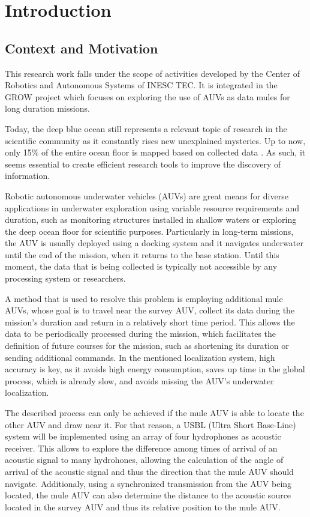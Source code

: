 \chapter{Introduction} \label{chap:intro}


\section{Context and Motivation} \label{sec:context}

This research work falls under the scope of activities developed by the Center of Robotics and Autonomous Systems of INESC TEC. It is integrated in the GROW project which focuses on exploring the use of AUVs as data mules for long duration missions.

Today, the deep blue ocean still represents a relevant topic of research in the scientific community as it constantly rises new unexplained mysteries. Up to now, only 15\% of the entire ocean floor is mapped based on collected data \cite{deeperblue}. As such, it seems essential to create efficient research tools to improve the discovery of information.


Robotic autonomous underwater vehicles (AUVs) are great means for diverse applications in underwater exploration using variable resource requirements and duration, such as monitoring structures installed in shallow waters or exploring the deep ocean floor for scientific purposes. Particularly in long-term missions, the AUV is usually deployed using a docking system and it navigates underwater until the end of the mission, when it returns to the base station. Until this moment, the data that is being collected is typically not accessible by any processing system or researchers. 

A method that is used to resolve this problem is employing additional mule AUVs, whose goal is to travel near the survey AUV, collect its data during the mission's duration and return in a relatively short time period. This allows the data to be periodically processed during the mission, which facilitates the definition of future courses for the mission, such as shortening its duration or sending additional commands. In the mentioned localization system, high accuracy is key, as it avoids high energy consumption, saves up time in the global process, which is already slow, and avoids missing the AUV's underwater localization.

The described process can only be achieved if the mule AUV is able to locate the other AUV and draw near it. For that reason, a USBL (Ultra Short Base-Line) system will be implemented using an array of four hydrophones as acoustic receiver. This allows to explore the difference among times of arrival of an acoustic signal to many hydrohones, allowing the calculation of the angle of arrival of the acoustic signal and thus the direction that the mule AUV should navigate. Additionaly, using a synchronized transmission from the AUV being located, the mule AUV can also determine the distance to the acoustic source located in the survey AUV and thus its relative position to the mule AUV.


